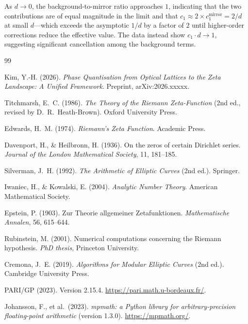 \documentclass[11pt, a4paper]{article}
\theoremstyle{plain}
\theoremstyle{definition}
\begin{document}
As $d\to 0$, the background-to-mirror ratio approaches $1$, indicating
that the two contributions are of equal magnitude in the limit and that
$c_{1}\approx 2\times c_{1}^{\text{mirror}}=2/d$ at small $d$---which
exceeds the asymptotic $1/d$ by a factor of $2$ until higher-order
corrections reduce the effective value.  The data instead show
$c_{1}\cdot d\to 1$, suggesting significant cancellation among the
background terms.


\begin{thebibliography}{99}

Kim, Y.-H. (2026).
\textit{Phase Quantisation from Optical Lattices to the Zeta Landscape:
A Unified Framework}.
Preprint, arXiv:2026.xxxxx.

Titchmarsh, E.~C. (1986).
\textit{The Theory of the Riemann Zeta-Function} (2nd ed., revised by
D.~R.~Heath-Brown).
Oxford University Press.

Edwards, H.~M. (1974).
\textit{Riemann's Zeta Function}.
Academic Press.

Davenport, H., \& Heilbronn, H. (1936).
On the zeros of certain Dirichlet series.
\textit{Journal of the London Mathematical Society}, 11, 181--185.

Silverman, J.~H. (1992).
\textit{The Arithmetic of Elliptic Curves} (2nd ed.).
Springer.

Iwaniec, H., \& Kowalski, E. (2004).
\textit{Analytic Number Theory}.
American Mathematical Society.

Epstein, P. (1903).
Zur Theorie allgemeiner Zetafunktionen.
\textit{Mathematische Annalen}, 56, 615--644.

Rubinstein, M. (2001).
Numerical computations concerning the Riemann hypothesis.
\textit{PhD thesis}, Princeton University.

Cremona, J.~E. (2019).
\textit{Algorithms for Modular Elliptic Curves} (2nd ed.).
Cambridge University Press.

PARI/GP (2023). Version 2.15.4.
\url{https://pari.math.u-bordeaux.fr/}.

Johansson, F., et al.\ (2023).
\textit{mpmath: a Python library for arbitrary-precision
floating-point arithmetic} (version 1.3.0).
\url{https://mpmath.org/}.

\end{thebibliography}
\end{document}
